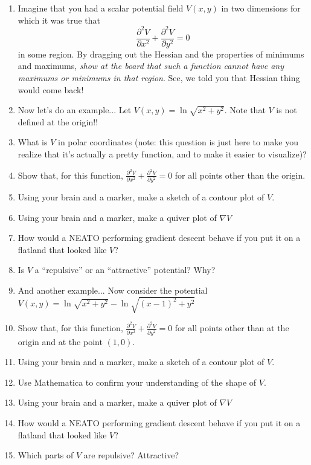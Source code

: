 \documentclass{tufte-handout}
\begin{document}
\begin{enumerate}[series=exercises, label=\textbf{Exercise} (\arabic*)]
\begin{enumerate}[resume=exercises, label=\textbf{Exercise} (\arabic*)]
\begin{enumerate}[resume=exercises, label=\textbf{Exercise} (\arabic*)]
\begin{enumerate}[resume=exercises, label=\textbf{Exercise} (\arabic*)]
\item Imagine that you had a scalar potential field $V(x,y)$ in two dimensions for which it was true that
$$ \frac{\partial^2 V}{\partial x^2}+  \frac{\partial^2 V}{\partial y^2}  = 0$$ in some region.  By dragging out the Hessian and the properties of minimums and maximums, {\it show at the board that such a function cannot have any maximums or minimums in that region}.  See, we told you that Hessian thing would come back!
\item  Now let's do an example... Let $V(x,y) = \ln \sqrt{x^2 + y^2}$.    Note that $V$ is not defined at the origin!!
\be 
\item What is $V$ in polar coordinates (note: this question is just here to make you realize that it's actually a pretty function, and to make it easier to visualize)?
\item Show that, for this function,  $ \frac{\partial^2 V}{\partial x^2} +  \frac{\partial^2 V}{\partial y^2}  = 0$ for all points other than the origin.
\item Using your brain and a marker, make a sketch of a contour plot of $V$. 
\item Using your brain and a marker, make a quiver plot of  $\nabla V$
\item How would a NEATO performing gradient descent behave if you put it on a flatland that looked like $V$?
\item Is $V$ a ``repulsive'' or an ``attractive'' potential?  Why?
\ee
\item And another example... Now consider the potential $V(x,y) = \ln \sqrt{x^2 + y^2} -  \ln \sqrt{(x-1)^2 + y^2}$
\be
\item Show that, for this function,  $ \frac{\partial^2 V}{\partial x^2} +  \frac{\partial^2 V}{\partial y^2}  = 0$ for all points other than at the origin and at the point $(1,0)$.
\item Using your brain and a marker, make a sketch of a contour plot of $V$. 
\item Use Mathematica to confirm your understanding of the shape of $V$.
\item Using your brain and a marker, make a quiver plot of  $\nabla V$
\item How would a NEATO performing gradient descent behave if you put it on a flatland that looked like $V$?
\item Which parts of $V$ are repulsive?  Attractive?

\end{enumerate}
\end{enumerate}
\end{enumerate}
\end{enumerate}
\end{document}
